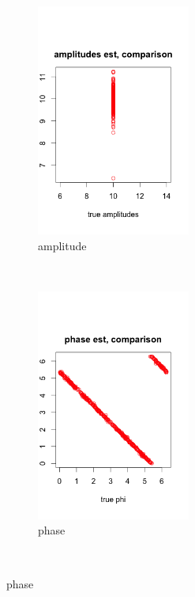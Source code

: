 \documentclass[11pt]{article}
\begin{document}
 \begin{figure}[ht]
    \centering    
     \begin{subfigure}[t]{0.5\textwidth}
        \centering
        \includegraphics[height=3in]{../figures/cell_order_R_figs/amp_compare.png}
        \caption{amplitude}
    \end{subfigure}%
    ~
    \begin{subfigure}[t]{0.5\textwidth}
        \centering
        \includegraphics[height=3in]{../figures/cell_order_R_figs/phi_compare.png}
        \caption{phase}
    \end{subfigure}\\
    

\end{figure}
\end{document}
